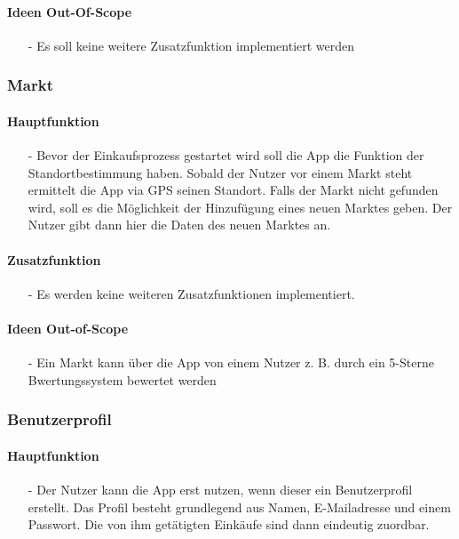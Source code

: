 \documentclass[12pt,a4paper]{article}
\begin{document}
\paragraph{Ideen Out-Of-Scope}
\begin{itemize}
\item[-]Es soll keine weitere Zusatzfunktion implementiert werden
\end{itemize}
\subsubsection{Markt}
\paragraph{Hauptfunktion}
\begin{itemize}
\item[-]Bevor der Einkaufsprozess gestartet wird soll die App die Funktion der Standortbestimmung haben. Sobald der Nutzer vor einem Markt steht ermittelt die App via GPS seinen Standort. Falls der Markt nicht gefunden wird, soll es die Möglichkeit der Hinzufügung eines neuen Marktes geben. Der Nutzer gibt dann hier die Daten des neuen Marktes an.
\end{itemize}
\paragraph{Zusatzfunktion}
\begin{itemize}
\item[-]Es werden keine weiteren Zusatzfunktionen implementiert.
\end{itemize}
\paragraph{Ideen Out-of-Scope}
\begin{itemize}
\item[-]Ein Markt kann über die App von einem Nutzer z. B. durch ein 5-Sterne Bwertungssystem bewertet werden
\end{itemize}

\subsubsection{Benutzerprofil}
\paragraph{Hauptfunktion}
\begin{itemize}
\item[-]Der Nutzer kann die App erst nutzen, wenn dieser ein Benutzerprofil erstellt. Das Profil besteht grundlegend aus Namen, E-Mailadresse und einem Passwort. Die von ihm getätigten Einkäufe sind dann eindeutig zuordbar.
\end{itemize}
\end{document}
